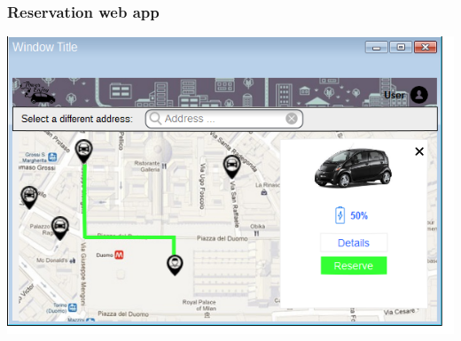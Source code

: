 \clearpage
\subsubsection{Reservation web app}
\begin{center}
\includegraphics[]{../images/mookup/Reservation_web}
\end{center}

\clearpage
